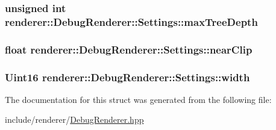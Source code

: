 \hypertarget{structrenderer_1_1DebugRenderer_1_1Settings_aa555f98388dec0bba7571d15407e362e}{
\subsubsection[{max\-Tree\-Depth}]{\setlength{\rightskip}{0pt plus 5cm}unsigned int renderer\-::\-Debug\-Renderer\-::\-Settings\-::max\-Tree\-Depth}}\label{structrenderer_1_1DebugRenderer_1_1Settings_aa555f98388dec0bba7571d15407e362e}
\hypertarget{structrenderer_1_1DebugRenderer_1_1Settings_a4522926071f9aad85caf900687fd84ab}{
\subsubsection[{near\-Clip}]{\setlength{\rightskip}{0pt plus 5cm}float renderer\-::\-Debug\-Renderer\-::\-Settings\-::near\-Clip}}\label{structrenderer_1_1DebugRenderer_1_1Settings_a4522926071f9aad85caf900687fd84ab}
\hypertarget{structrenderer_1_1DebugRenderer_1_1Settings_acb80e3e6daf15e6cd798a7681e6fdb12}{
\subsubsection[{width}]{\setlength{\rightskip}{0pt plus 5cm}Uint16 renderer\-::\-Debug\-Renderer\-::\-Settings\-::width}}\label{structrenderer_1_1DebugRenderer_1_1Settings_acb80e3e6daf15e6cd798a7681e6fdb12}


The documentation for this struct was generated from the following file\-:\begin{DoxyCompactItemize}
\item 
include/renderer/\hyperlink{DebugRenderer_8hpp}{Debug\-Renderer.\-hpp}\end{DoxyCompactItemize}
